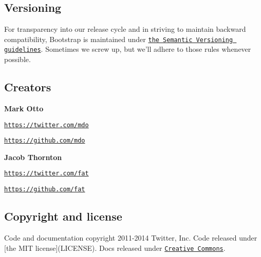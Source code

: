 \subsection*{Versioning}

For transparency into our release cycle and in striving to maintain backward compatibility, Bootstrap is maintained under \href{http://semver.org/}{\tt the Semantic Versioning guidelines}. Sometimes we screw up, but we'll adhere to those rules whenever possible.

\subsection*{Creators}

{\bfseries Mark Otto}


\begin{DoxyItemize}
\item \href{https://twitter.com/mdo}{\tt https\-://twitter.\-com/mdo}
\item \href{https://github.com/mdo}{\tt https\-://github.\-com/mdo}
\end{DoxyItemize}

{\bfseries Jacob Thornton}


\begin{DoxyItemize}
\item \href{https://twitter.com/fat}{\tt https\-://twitter.\-com/fat}
\item \href{https://github.com/fat}{\tt https\-://github.\-com/fat}
\end{DoxyItemize}

\subsection*{Copyright and license}

Code and documentation copyright 2011-\/2014 Twitter, Inc. Code released under \mbox{[}the M\-I\-T license\mbox{]}(L\-I\-C\-E\-N\-S\-E). Docs released under \href{docs/LICENSE}{\tt Creative Commons}. 